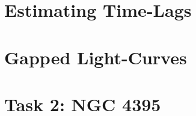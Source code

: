 \documentclass[letterpaper, oneside]{article}
\begin{document}
\section{Estimating Time-Lags}



\section{Gapped Light-Curves}




\section*{Task 2: NGC 4395}

\cite{Edri_2012}





\end{document}
